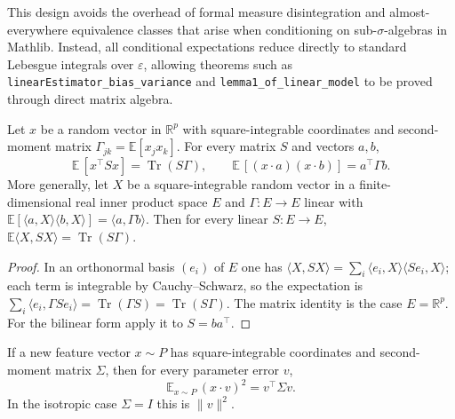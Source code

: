 \begin{remark}
This design avoids the overhead of formal measure disintegration and almost-everywhere equivalence classes that arise when conditioning on sub-$\sigma$-algebras in Mathlib. Instead, all conditional expectations reduce directly to standard Lebesgue integrals over $\varepsilon$, allowing theorems such as \texttt{linearEstimator\_bias\_variance} and \texttt{lemma1\_of\_linear\_model} to be proved through direct matrix algebra.
\end{remark}

\begin{lemma}\label{lem:dd:secondMoments}
  \leanok
Let $x$ be a random vector in $\mathbb R^p$ with square-integrable coordinates and second-moment matrix
$\Gamma_{jk}=\mathbb E[x_jx_k]$. For every matrix $S$ and vectors $a,b$,
\[
  \mathbb E\,[x^\top Sx]=\operatorname{Tr}(S\Gamma),\qquad \mathbb E\,[(x\cdot a)(x\cdot b)]=a^\top\Gamma b .
\]
More generally, let $X$ be a square-integrable random vector in a finite-dimensional real inner product space $E$ and
$\Gamma:E\to E$ linear with $\mathbb E[\langle a,X\rangle\langle b,X\rangle]=\langle a,\Gamma b\rangle$. Then for every linear
$S:E\to E$, $\mathbb E\langle X,SX\rangle=\operatorname{Tr}(S\Gamma)$.
\end{lemma}

\begin{proof}
  \leanok
In an orthonormal basis $(e_i)$ of $E$ one has $\langle X,SX\rangle=\sum_i\langle e_i,X\rangle\langle Se_i,X\rangle$; each term is
integrable by Cauchy--Schwarz, so the expectation is $\sum_i\langle e_i,\Gamma Se_i\rangle=\operatorname{Tr}(\Gamma S)=\operatorname{Tr}(S\Gamma)$.
The matrix identity is the case $E=\mathbb R^p$. For the bilinear form apply it to $S=ba^\top$.
\end{proof}

\begin{lemma}\label{lem:dd:excessRisk}
  \leanok
If a new feature vector $x\sim P$ has square-integrable coordinates and second-moment matrix $\Sigma$, then for every
parameter error $v$,
\[
  \mathbb E_{x\sim P}\,(x\cdot v)^2=v^\top\Sigma v .
\]
In the isotropic case $\Sigma=I$ this is $\|v\|^2$.
\end{lemma}

